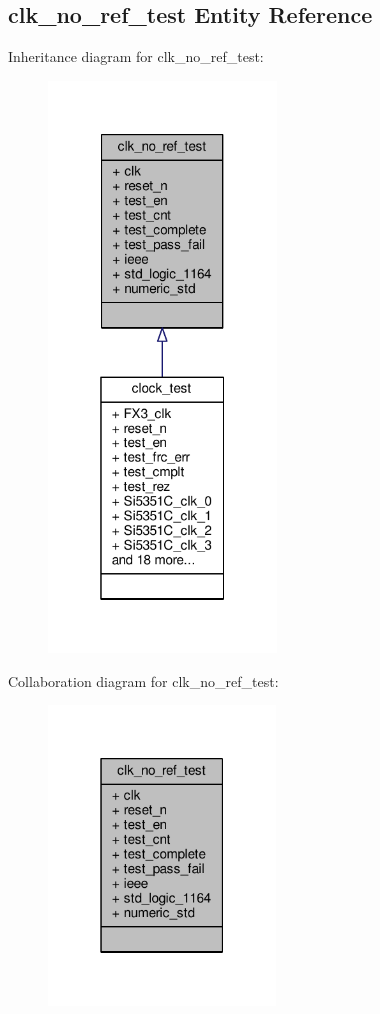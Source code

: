 \subsection{clk\+\_\+no\+\_\+ref\+\_\+test Entity Reference}
\label{classclk__no__ref__test}


Inheritance diagram for clk\+\_\+no\+\_\+ref\+\_\+test\+:\nopagebreak
\begin{figure}[H]
\begin{center}
\leavevmode
\includegraphics[width=172pt]{d6/d23/classclk__no__ref__test__inherit__graph}
\end{center}
\end{figure}


Collaboration diagram for clk\+\_\+no\+\_\+ref\+\_\+test\+:\nopagebreak
\begin{figure}[H]
\begin{center}
\leavevmode
\includegraphics[width=171pt]{d9/dc4/classclk__no__ref__test__coll__graph}
\end{center}
\end{figure}
